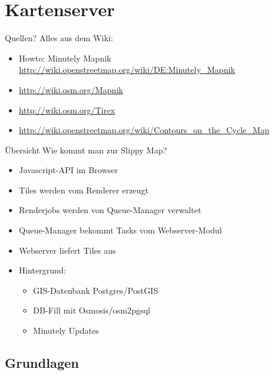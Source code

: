 \documentclass{beamer}
\begin{document}
\section{Kartenserver}

\begin{frame}{Quellen?}
  Alles aus dem Wiki:

  \begin{itemize}
              \item  Howto: Minutely Mapnik             \url{http://wiki.openstreetmap.org/wiki/DE:Minutely\_Mapnik}
  \item   \url{http://wiki.osm.org/Mapnik}
  \item \url{http://wiki.osm.org/Tirex}
  \item \url{http://wiki.openstreetmap.org/wiki/Contours\_on\_the\_Cycle\_Map}
\end{itemize}


\end{frame}



\begin{frame}{Übersicht}
  Wie kommt man zur Slippy Map?
  \pause
  \begin{itemize}
        \item Javascript-API im Browser
        \item Tiles werden vom Renderer erzeugt
        \item Renderjobs werden von Queue-Manager verwaltet
        \item Queue-Manager bekommt Tasks vom Webserver-Modul
        \item Webserver liefert Tiles aus
        \item Hintergrund: 
          \begin{itemize}
                  \item GIS-Datenbank Postgres/PostGIS
                  \item DB-Fill mit Osmosis/osm2pgsql
                  \item Minutely Updates
         \end{itemize}
       \end{itemize}


\end{frame}


\subsection{Grundlagen}
\end{document}
